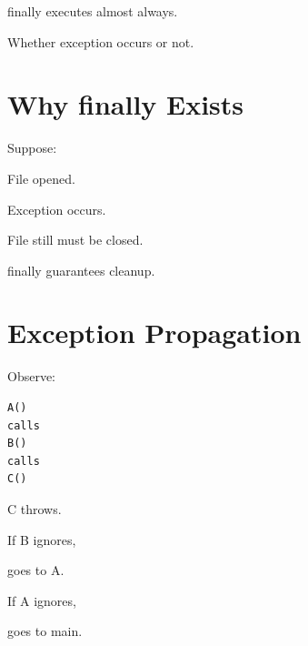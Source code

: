 \documentclass[11pt,a4paper]{book}
\begin{document}

finally executes almost always.


Whether exception occurs or not.


\section{Why finally Exists}

Suppose:


File opened.


Exception occurs.


File still must be closed.


finally guarantees cleanup.


\section{Exception Propagation}

Observe:

\begin{verbatim} 
A()
calls
B()
calls
C()
\end{verbatim}


C throws.


If B ignores,

goes to A.


If A ignores,

goes to main.

\end{document}
